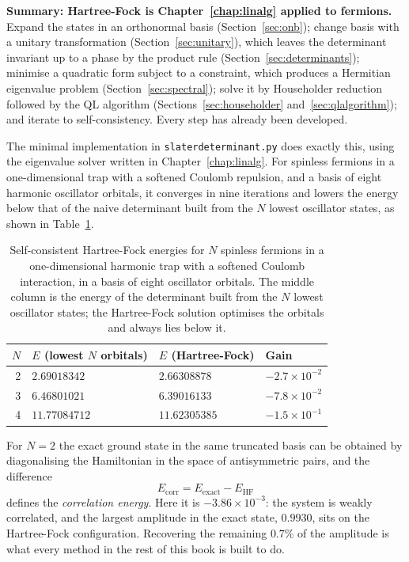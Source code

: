 \begin{notebox}
\textbf{Summary: Hartree-Fock is Chapter~\ref{chap:linalg} applied to
fermions.} Expand the states in an orthonormal basis
(Section~\ref{sec:onb}); change basis with a unitary transformation
(Section~\ref{sec:unitary}), which leaves the determinant invariant up to a
phase by the product rule (Section~\ref{sec:determinants}); minimise a
quadratic form subject to a constraint, which produces a Hermitian eigenvalue
problem (Section~\ref{sec:spectral}); solve it by Householder reduction
followed by the QL algorithm (Sections~\ref{sec:householder}
and~\ref{sec:qlalgorithm}); and iterate to self-consistency.  Every step has
already been developed.
\end{notebox}

The minimal implementation in \texttt{slaterdeterminant.py} does exactly this,
using the eigenvalue solver written in Chapter~\ref{chap:linalg}.  For
spinless fermions in a one-dimensional trap with a softened Coulomb
repulsion, and a basis of eight harmonic oscillator orbitals, it converges in
nine iterations and lowers the energy below that of the naive determinant
built from the $N$ lowest oscillator states, as shown in
Table~\ref{tab:hfgain}.

\begin{table}[h]
\centering
\renewcommand{\arraystretch}{1.25}
\setlength{\tabcolsep}{10pt}
\begin{tabular}{rlll}
\toprule
$N$ & $E$ (lowest $N$ orbitals) & $E$ (Hartree-Fock) & \textbf{Gain}\\
\midrule
2 & $2.69018342$  & $2.66308878$  & $-2.7\times10^{-2}$\\
3 & $6.46801021$  & $6.39016133$  & $-7.8\times10^{-2}$\\
4 & $11.77084712$ & $11.62305385$ & $-1.5\times10^{-1}$\\
\bottomrule
\end{tabular}
\caption{Self-consistent Hartree-Fock energies for $N$ spinless fermions in a
one-dimensional harmonic trap with a softened Coulomb interaction, in a basis
of eight oscillator orbitals.  The middle column is the energy of the
determinant built from the $N$ lowest oscillator states; the Hartree-Fock
solution optimises the orbitals and always lies below it.}
\label{tab:hfgain}
\end{table}

For $N=2$ the exact ground state in the same truncated basis can be obtained
by diagonalising the Hamiltonian in the space of antisymmetric pairs, and the
difference
\begin{equation}
  E_{\mathrm{corr}} = E_{\mathrm{exact}} - E_{\mathrm{HF}}
  \label{eq:2-correlation}
\end{equation}
defines the \emph{correlation energy}.  Here it is $-3.86\times10^{-3}$: the
system is weakly correlated, and the largest amplitude in the exact state,
$0.9930$, sits on the Hartree-Fock configuration.  Recovering the remaining
$0.7\%$ of the amplitude is what every method in the rest of this book is
built to do.

